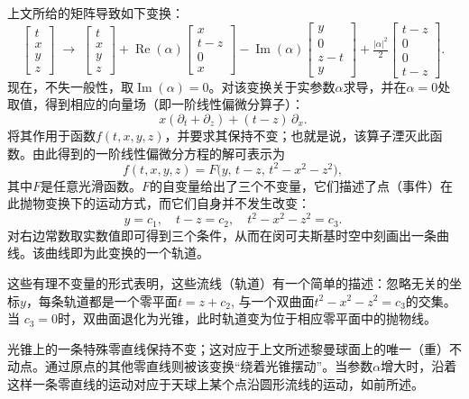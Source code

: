上文所给的矩阵导致如下变换：
\[
\begin{bmatrix}
t \\ x \\ y \\ z
\end{bmatrix}
\;\longrightarrow\;
\begin{bmatrix}
t \\ x \\ y \\ z
\end{bmatrix}
+ \operatorname{Re}(\alpha)
\begin{bmatrix}
x \\ t-z \\ 0 \\ x
\end{bmatrix}
- \operatorname{Im}(\alpha)
\begin{bmatrix}
y \\ 0 \\ z-t \\ y
\end{bmatrix}
+ \tfrac{|\alpha|^{2}}{2}
\begin{bmatrix}
t-z \\ 0 \\ 0 \\ t-z
\end{bmatrix}.~
\]
现在，不失一般性，取$\operatorname{Im}(\alpha) = 0$。对该变换关于实参数$\alpha$求导，并在$\alpha=0$处取值，得到相应的向量场（即一阶线性偏微分算子）：
\[
x\left(\partial_{t} + \partial_{z}\right) + (t-z)\,\partial_{x}.~
\]
将其作用于函数$f(t,x,y,z)$，并要求其保持不变；也就是说，该算子湮灭此函数。由此得到的一阶线性偏微分方程的解可表示为
\[
f(t,x,y,z) = F\bigl(y,\, t-z,\, t^{2}-x^{2}-z^{2}\bigr),~
\]
其中$F$是任意光滑函数。$F$的自变量给出了三个不变量，它们描述了点（事件）在此抛物变换下的运动方式，而它们自身并不发生改变：
\[
y = c_{1}, \quad t-z = c_{2}, \quad t^{2} - x^{2} - z^{2} = c_{3}.~
\]
对右边常数取实数值即可得到三个条件，从而在闵可夫斯基时空中刻画出一条曲线。该曲线即为此变换的一个轨道。

这些有理不变量的形式表明，这些流线（轨道）有一个简单的描述：忽略无关的坐标$y$，每条轨道都是一个零平面$t = z + c_{2}$,
与一个双曲面$t^{2} - x^{2} - z^{2} = c_{3}$的交集。当 $c_{3} = 0$时，双曲面退化为光锥，此时轨道变为位于相应零平面中的抛物线。

光锥上的一条特殊零直线保持不变；这对应于上文所述黎曼球面上的唯一（重）不动点。通过原点的其他零直线则被该变换“绕着光锥摆动”。当参数$\alpha$增大时，沿着这样一条零直线的运动对应于天球上某个点沿圆形流线的运动，如前所述。

